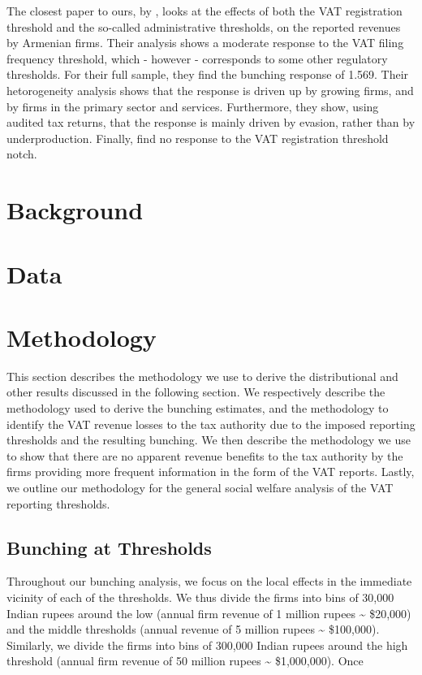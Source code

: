 The closest paper to ours, by \citet{asatryan2017responses}, looks at the effects of both the VAT registration threshold and the so-called administrative thresholds, on the reported revenues by Armenian firms. Their analysis shows a moderate response to the VAT filing frequency threshold, which - however - corresponds to some other regulatory thresholds. For their full sample, they find the bunching response of 1.569. Their hetorogeneity analysis shows that the response is driven up by growing firms, and by firms in the primary sector and services. Furthermore, they show, using audited tax returns, that the response is mainly driven by evasion, rather than by underproduction. Finally, \citet{asatryan2017responses} find no response to the VAT registration threshold notch. 



\section{Background}
\label{sec:background}

\section{Data}
\label{sec:3-data}



\section{Methodology}
\label{sec:methodology}
This section describes the methodology we use to derive the distributional
and other results discussed in the following section. We respectively
describe the methodology used to derive the bunching estimates, and
the methodology to identify the VAT revenue losses to the tax authority
due to the imposed reporting thresholds and the resulting bunching.
We then describe the methodology we use to show that there are no
apparent revenue benefits to the tax authority by the firms providing
more frequent information in the form of the VAT reports. Lastly,
we outline our methodology for the general social welfare analysis
of the VAT reporting thresholds.

\subsection{Bunching at Thresholds}
\label{subsec:methodology-bunching}

Throughout our bunching analysis, we focus on the local effects in
the immediate vicinity of each of the thresholds. We thus divide the
firms into bins of 30,000 Indian rupees around the low (annual firm
revenue of 1 million rupees \textasciitilde{} \$20,000) and the middle
thresholds (annual revenue of 5 million rupees \textasciitilde{} \$100,000).
Similarly, we divide the firms into bins of 300,000 Indian rupees
around the high threshold (annual firm revenue of 50 million rupees
\textasciitilde{} \$1,000,000). Once

